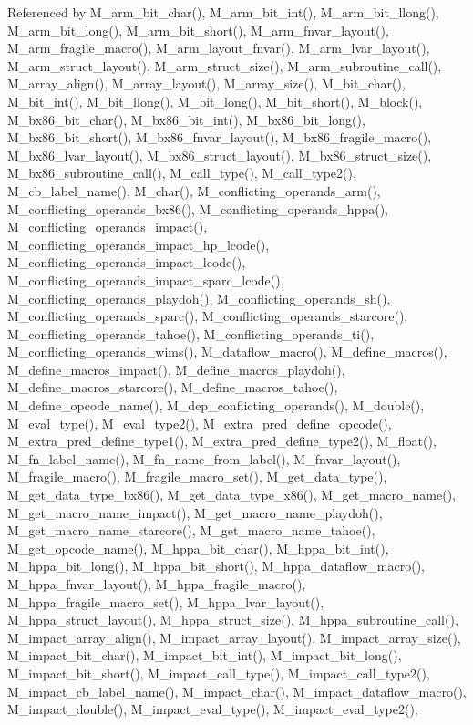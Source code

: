 Referenced by M\_\-arm\_\-bit\_\-char(), M\_\-arm\_\-bit\_\-int(), M\_\-arm\_\-bit\_\-llong(), M\_\-arm\_\-bit\_\-long(), M\_\-arm\_\-bit\_\-short(), M\_\-arm\_\-fnvar\_\-layout(), M\_\-arm\_\-fragile\_\-macro(), M\_\-arm\_\-layout\_\-fnvar(), M\_\-arm\_\-lvar\_\-layout(), M\_\-arm\_\-struct\_\-layout(), M\_\-arm\_\-struct\_\-size(), M\_\-arm\_\-subroutine\_\-call(), M\_\-array\_\-align(), M\_\-array\_\-layout(), M\_\-array\_\-size(), M\_\-bit\_\-char(), M\_\-bit\_\-int(), M\_\-bit\_\-llong(), M\_\-bit\_\-long(), M\_\-bit\_\-short(), M\_\-block(), M\_\-bx86\_\-bit\_\-char(), M\_\-bx86\_\-bit\_\-int(), M\_\-bx86\_\-bit\_\-long(), M\_\-bx86\_\-bit\_\-short(), M\_\-bx86\_\-fnvar\_\-layout(), M\_\-bx86\_\-fragile\_\-macro(), M\_\-bx86\_\-lvar\_\-layout(), M\_\-bx86\_\-struct\_\-layout(), M\_\-bx86\_\-struct\_\-size(), M\_\-bx86\_\-subroutine\_\-call(), M\_\-call\_\-type(), M\_\-call\_\-type2(), M\_\-cb\_\-label\_\-name(), M\_\-char(), M\_\-conflicting\_\-operands\_\-arm(), M\_\-conflicting\_\-operands\_\-bx86(), M\_\-conflicting\_\-operands\_\-hppa(), M\_\-conflicting\_\-operands\_\-impact(), M\_\-conflicting\_\-operands\_\-impact\_\-hp\_\-lcode(), M\_\-conflicting\_\-operands\_\-impact\_\-lcode(), M\_\-conflicting\_\-operands\_\-impact\_\-sparc\_\-lcode(), M\_\-conflicting\_\-operands\_\-playdoh(), M\_\-conflicting\_\-operands\_\-sh(), M\_\-conflicting\_\-operands\_\-sparc(), M\_\-conflicting\_\-operands\_\-starcore(), M\_\-conflicting\_\-operands\_\-tahoe(), M\_\-conflicting\_\-operands\_\-ti(), M\_\-conflicting\_\-operands\_\-wims(), M\_\-dataflow\_\-macro(), M\_\-define\_\-macros(), M\_\-define\_\-macros\_\-impact(), M\_\-define\_\-macros\_\-playdoh(), M\_\-define\_\-macros\_\-starcore(), M\_\-define\_\-macros\_\-tahoe(), M\_\-define\_\-opcode\_\-name(), M\_\-dep\_\-conflicting\_\-operands(), M\_\-double(), M\_\-eval\_\-type(), M\_\-eval\_\-type2(), M\_\-extra\_\-pred\_\-define\_\-opcode(), M\_\-extra\_\-pred\_\-define\_\-type1(), M\_\-extra\_\-pred\_\-define\_\-type2(), M\_\-float(), M\_\-fn\_\-label\_\-name(), M\_\-fn\_\-name\_\-from\_\-label(), M\_\-fnvar\_\-layout(), M\_\-fragile\_\-macro(), M\_\-fragile\_\-macro\_\-set(), M\_\-get\_\-data\_\-type(), M\_\-get\_\-data\_\-type\_\-bx86(), M\_\-get\_\-data\_\-type\_\-x86(), M\_\-get\_\-macro\_\-name(), M\_\-get\_\-macro\_\-name\_\-impact(), M\_\-get\_\-macro\_\-name\_\-playdoh(), M\_\-get\_\-macro\_\-name\_\-starcore(), M\_\-get\_\-macro\_\-name\_\-tahoe(), M\_\-get\_\-opcode\_\-name(), M\_\-hppa\_\-bit\_\-char(), M\_\-hppa\_\-bit\_\-int(), M\_\-hppa\_\-bit\_\-long(), M\_\-hppa\_\-bit\_\-short(), M\_\-hppa\_\-dataflow\_\-macro(), M\_\-hppa\_\-fnvar\_\-layout(), M\_\-hppa\_\-fragile\_\-macro(), M\_\-hppa\_\-fragile\_\-macro\_\-set(), M\_\-hppa\_\-lvar\_\-layout(), M\_\-hppa\_\-struct\_\-layout(), M\_\-hppa\_\-struct\_\-size(), M\_\-hppa\_\-subroutine\_\-call(), M\_\-impact\_\-array\_\-align(), M\_\-impact\_\-array\_\-layout(), M\_\-impact\_\-array\_\-size(), M\_\-impact\_\-bit\_\-char(), M\_\-impact\_\-bit\_\-int(), M\_\-impact\_\-bit\_\-long(), M\_\-impact\_\-bit\_\-short(), M\_\-impact\_\-call\_\-type(), M\_\-impact\_\-call\_\-type2(), M\_\-impact\_\-cb\_\-label\_\-name(), M\_\-impact\_\-char(), M\_\-impact\_\-dataflow\_\-macro(), M\_\-impact\_\-double(), M\_\-impact\_\-eval\_\-type(), M\_\-impact\_\-eval\_\-type2(), 